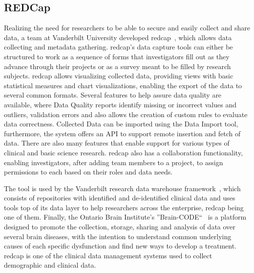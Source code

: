 \subsection*{REDCap}
Realizing the need for researchers to be able to secure and easily collect and share data, a team at Vanderbilt University developed \gls{redcap}~\cite{redcap}, which allows data collecting and metadata gathering.
\gls{redcap}'s data capture tools can either be structured to work as a sequence of forms that investigators fill out as they advance through their projects or as a survey meant to be filled by research subjects.
\gls{redcap} allows visualizing collected data, providing views with basic statistical measures and chart visualizations, enabling the export of the data to several common formats.
Several features to help assure data quality are available, where Data Quality reports identify missing or incorrect values and outliers, validation errors and also allows the creation of custom rules to evaluate data correctness.
Collected Data can be imported using the Data Import tool, furthermore, the system offers an API to support remote insertion and fetch of data.
There are also many features that enable support for various types of clinical and basic science research.
\gls{redcap} also has a collaboration functionality, enabling investigators, after adding team members to a project, to assign permissions to each based on their roles and data needs.

The tool is used by the Vanderbilt research data warehouse framework~\cite{vanderbilt}, which consists of repositories with identified and de-identified clinical data and uses tools top of its data layer to help researchers across the enterprise, \gls{redcap} being one of them.
Finally, the Ontario Brain Institute’s ''Brain-CODE``~\cite{braincode} is a platform designed to promote the collection, storage, sharing and analysis of data over several brain diseases, with the intention to understand common underlying causes of each specific dysfunction and find new ways to develop a treatment.
\gls{redcap} is one of the clinical data management systems used to
collect demographic and clinical data.

